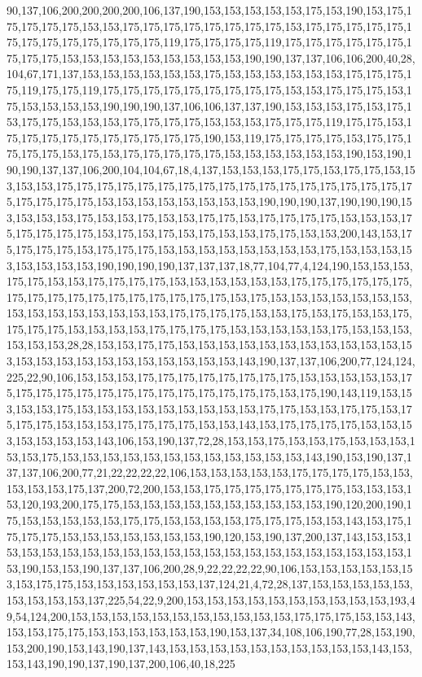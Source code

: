 90,137,106,200,200,200,200,106,137,190,153,153,153,153,153,175,153,190,153,175,175,175,175,175,153,153,175,175,175,175,175,175,175,175,153,175,175,175,175,175,175,175,175,175,175,175,175,175,119,175,175,175,175,119,175,175,175,175,175,175,175,175,175,153,153,153,153,153,153,153,153,153,190,190,137,137,106,106,200,40,28,104,67,171,137,153,153,153,153,153,153,175,153,153,153,153,153,153,175,175,175,175,119,175,175,119,175,175,175,175,175,175,175,175,175,153,153,175,175,175,153,175,153,153,153,153,190,190,190,137,106,106,137,137,190,153,153,153,175,153,175,153,175,175,153,153,153,175,175,175,175,153,153,153,175,175,175,119,175,175,153,175,175,175,175,175,175,175,175,175,175,190,153,119,175,175,175,175,153,175,175,175,175,175,153,175,153,175,175,175,175,175,153,153,153,153,153,153,190,153,190,190,190,137,137,106,200,104,104,67,18,4,137,153,153,153,175,175,153,175,175,153,153,153,153,175,175,175,175,175,175,175,175,175,175,175,175,175,175,175,175,175,175,175,175,175,175,153,153,153,153,153,153,153,153,190,190,190,137,190,190,190,153,153,153,153,175,153,153,175,153,153,175,175,153,175,175,175,175,153,153,153,175,175,175,175,175,153,175,153,175,153,175,153,153,175,175,153,153,200,143,153,175,175,175,175,153,175,175,175,153,153,153,153,153,153,153,153,175,153,153,153,153,153,153,153,153,190,190,190,190,137,137,137,18,77,104,77,4,124,190,153,153,153,175,175,153,153,175,175,175,175,153,153,153,153,153,153,175,175,175,175,175,175,175,175,175,175,175,175,175,175,175,175,175,153,175,153,153,153,153,153,153,153,153,153,153,153,153,153,153,153,175,175,175,175,153,153,175,153,175,153,153,175,175,175,175,153,153,153,153,175,175,175,175,153,153,153,153,153,175,153,153,153,153,153,153,28,28,153,153,175,175,153,153,153,153,153,153,153,153,153,153,153,153,153,153,153,153,153,153,153,153,153,153,153,143,190,137,137,106,200,77,124,124,225,22,90,106,153,153,153,175,175,175,175,175,175,175,175,153,153,153,153,153,175,175,175,175,175,175,175,175,175,175,175,175,175,175,153,175,190,143,119,153,153,153,153,175,153,153,153,153,153,153,153,153,153,175,175,153,153,175,175,153,175,175,175,153,153,153,175,175,175,175,153,153,143,153,175,175,175,175,153,153,153,153,153,153,153,143,106,153,190,137,72,28,153,153,175,153,153,175,153,153,153,153,153,175,153,153,153,153,153,153,153,153,153,153,153,153,143,190,153,190,137,137,137,106,200,77,21,22,22,22,22,106,153,153,153,153,153,175,175,175,175,153,153,153,153,153,175,137,200,72,200,153,153,175,175,175,175,175,175,175,153,153,153,153,120,193,200,175,175,153,153,153,153,153,153,153,153,153,153,190,120,200,190,175,153,153,153,153,153,175,175,153,153,153,153,175,175,175,153,153,143,153,175,175,175,175,153,153,153,153,153,153,153,190,120,153,190,137,200,137,143,153,153,153,153,153,153,153,153,153,153,153,153,153,153,153,153,153,153,153,153,153,153,153,190,153,153,190,137,137,106,200,28,9,22,22,22,22,90,106,153,153,153,153,153,153,153,175,175,153,153,153,153,153,153,137,124,21,4,72,28,137,153,153,153,153,153,153,153,153,153,137,225,54,22,9,200,153,153,153,153,153,153,153,153,153,153,193,49,54,124,200,153,153,153,153,153,153,153,153,153,153,153,175,175,175,153,153,143,153,153,175,175,153,153,153,153,153,153,190,153,137,34,108,106,190,77,28,153,190,153,200,190,153,143,190,137,143,153,153,153,153,153,153,153,153,153,153,143,153,153,143,190,190,137,190,137,200,106,40,18,225